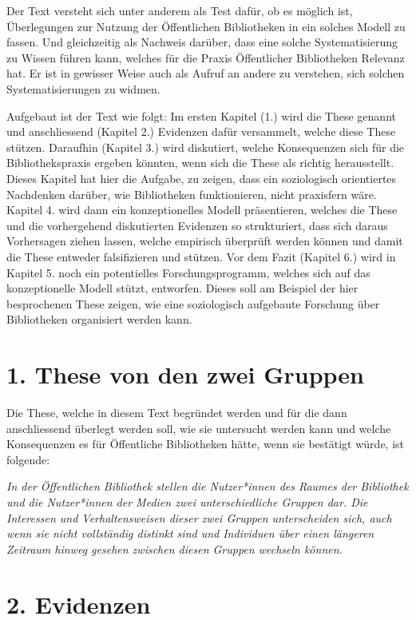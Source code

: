 \documentclass[a4paper,
fontsize=11pt,
oneside,
numbers=noperiodatend,
parskip=half-,
bibliography=totoc,
final
]{scrartcl}
\begin{document}
Der Text versteht sich unter anderem als Test dafür, ob es möglich ist,
Überlegungen zur Nutzung der Öffentlichen Bibliotheken in ein solches
Modell zu fassen. Und gleichzeitig als Nachweis darüber, dass eine
solche Systematisierung zu Wissen führen kann, welches für die Praxis
Öffentlicher Bibliotheken Relevanz hat. Er ist in gewisser Weise auch
als Aufruf an andere zu verstehen, sich solchen Systematisierungen zu
widmen.

Aufgebaut ist der Text wie folgt: Im ersten Kapitel (1.) wird die These
genannt und anschliessend (Kapitel 2.) Evidenzen dafür versammelt,
welche diese These stützen. Daraufhin (Kapitel 3.) wird diskutiert,
welche Konsequenzen sich für die Bibliothekspraxis ergeben könnten, wenn
sich die These als richtig herausstellt. Dieses Kapitel hat hier die
Aufgabe, zu zeigen, dass ein soziologisch orientiertes Nachdenken
darüber, wie Bibliotheken funktionieren, nicht praxisfern wäre. Kapitel
4. wird dann ein konzeptionelles Modell präsentieren, welches die These
und die vorhergehend diskutierten Evidenzen so strukturiert, dass sich
daraus Vorhersagen ziehen lassen, welche empirisch überprüft werden
können und damit die These entweder falsifizieren und stützen. Vor dem
Fazit (Kapitel 6.) wird in Kapitel 5. noch ein potentielles
Forschungsprogramm, welches sich auf das konzeptionelle Modell stützt,
entworfen. Dieses soll am Beispiel der hier besprochenen These zeigen,
wie eine soziologisch aufgebaute Forschung über Bibliotheken organisiert
werden kann.

\hypertarget{these-von-den-zwei-gruppen}{%
\section{1. These von den zwei
Gruppen}\label{these-von-den-zwei-gruppen}}

Die These, welche in diesem Text begründet werden und für die dann
anschliessend überlegt werden soll, wie sie untersucht werden kann und
welche Konsequenzen es für Öffentliche Bibliotheken hätte, wenn sie
bestätigt würde, ist folgende:

\emph{In der Öffentlichen Bibliothek stellen die Nutzer*innen des Raumes
der Bibliothek und die Nutzer*innen der Medien zwei unterschiedliche
Gruppen dar. Die Interessen und Verhaltensweisen dieser zwei Gruppen
unterscheiden sich, auch wenn sie nicht vollständig distinkt sind und
Individuen über einen längeren Zeitraum hinweg gesehen zwischen diesen
Gruppen wechseln können.}

\hypertarget{evidenzen}{%
\section{2. Evidenzen}\label{evidenzen}}
\end{document}
